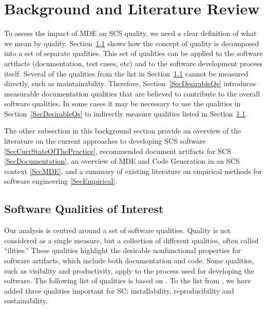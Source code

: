 \documentclass[12pt]{article}
\begin{document}
\section{Background and Literature Review} \label{SecBackgroundLitReview}

To assess the impact of MDE on SCS quality, we need a clear definition of what
we mean by quality.  Section~\ref{SecSoftwareQuality} shows how the concept of
quality is decomposed into a set of separate qualities.  This set of qualities
can be applied to the software artifacts (documentation, test cases, etc) and to
the software development process itself.  Several of the qualities from the list
in Section~\ref{SecSoftwareQuality} cannot be measured directly, such as
maintainability.  Therefore, Section~\ref{SecDesirableQs} introduces measurable
documentation qualities that are believed to contribute to the overall software
qualities.  In some cases it may be necessary to use the qualities in
Section~\ref{SecDesirableQs} to indirectly measure qualities listed in
Section~\ref{SecSoftwareQuality}.

The other subsection in this background section provide an overview of the
literature on the current approaches to developing SCS software
\ref{SecCurrStateOfThePractice}, recommended document artifacts for SCS
\ref{SecDocumentation}, an overview of MDE and Code Generation in an SCS context
\ref{SecMDE}, and a summary of existing literature on empirical methods for
software engineering \ref{SecEmpirical}.

\subsection{Software Qualities of Interest} \label{SecSoftwareQuality}

Our analysis is centred around a set of software qualities.  Quality is not
considered as a single measure, but a collection of different qualities, often
called ``ilities.''  These qualities highlight the desirable nonfunctional
properties for software artifacts, which include both documentation and
code. Some qualities, such as visibility and productivity, apply to the process
used for developing the software. The following list of qualities is based on
\cite{GhezziEtAl2003}. To the list from \cite{GhezziEtAl2003}, we have added
three qualities important for SC: installability, reproducibility and
sustainability.
\end{document}
